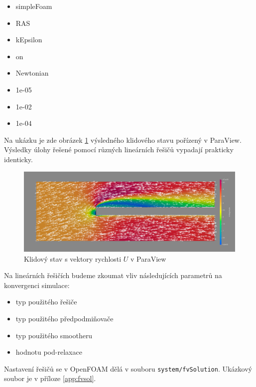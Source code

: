 \documentclass[a4paper,12pt]{report}
\theoremstyle{remark}
\begin{document}
\begin{itemize}
	\item{simpleFoam}
	\item{RAS}
	\item{kEpsilon}
	\item{on}
	\item{Newtonian}
	\item{1e-05}
	\item{1e-02}
	\item{1e-04}
\end{itemize}


	
Na ukázku je zde obrázek \ref{fig:pv-GAMG-GS} výsledného klidového stavu pořízený v ParaView. Výsledky úlohy řešené pomocí různých lineárních řešičů vypadají prakticky identicky.
	
	 \begin{figure}[H]
		\centering
		\includegraphics[width=1\linewidth]{pv-GAMG-GS.png}
		\caption{Klidový stav s vektory rychlosti $U$ v ParaView}
		\label{fig:pv-GAMG-GS}
	\end{figure}


Na lineárních řešičích budeme zkoumat vliv následujících parametrů na konvergenci simulace:
 
\begin{itemize}
	\item typ použitého řešiče
	\item typ použitého předpodmiňovače
	\item typ použitého smootheru
	\item hodnotu pod-relaxace
\end{itemize}

Nastavení řešičů se v OpenFOAM dělá v souboru \texttt{system/fvSolution}. Ukázkový soubor je v příloze \ref{app:fvsol}.
	
\end{document}
